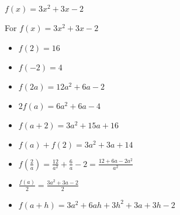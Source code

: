 {$f(x) = 3x^2+3x-2$}
{For $f(x) = 3x^2+3x-2$

\begin{itemize}
\item  $f(2) = 16$
\item  $f(-2) = 4$
\item  $f(2a) = 12a^2+6a-2$
\item  $2 f(a) = 6a^2+6a-4$
\item $f(a+2) = 3a^2+15a+16$
\item  $f(a) + f(2) = 3a^2+3a+14$
\item  $f \left( \frac{2}{a} \right) = \frac{12}{a^2} + \frac{6}{a} - 2 = \frac{12+6a-2a^2}{a^2}$
\item $\frac{f(a)}{2} =  \frac{3a^2+3a-2}{2}$
\item  $f(a + h) = 3a^2 + 6ah + 3h^2+3a+3h-2$
\end{itemize}
}